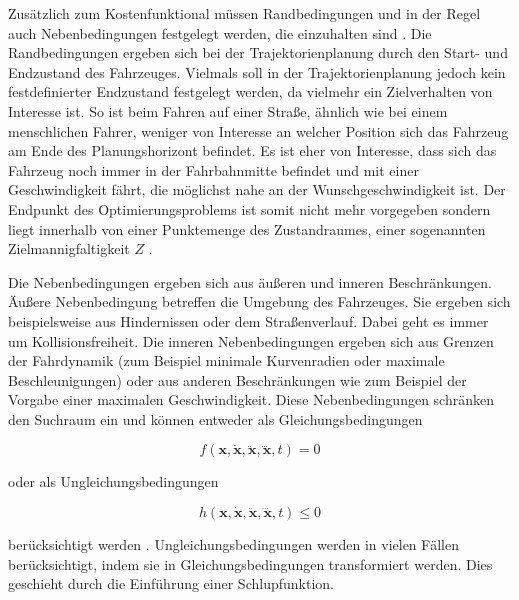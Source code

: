 Zus\"atzlich zum Kostenfunktional m\"ussen Randbedingungen und in der Regel auch Nebenbedingungen festgelegt werden, die einzuhalten sind \cite{Follinger1988}.
Die Randbedingungen ergeben sich bei der Trajektorienplanung durch den Start- und  Endzustand des Fahrzeuges.
Vielmals soll in der Trajektorienplanung jedoch kein festdefinierter Endzustand festgelegt werden, da vielmehr ein Zielverhalten von Interesse ist. 
So ist beim Fahren auf einer Stra{\ss}e, \"ahnlich wie bei einem menschlichen Fahrer, weniger von Interesse an welcher Position sich das Fahrzeug am Ende des Planungshorizont befindet. 
Es ist eher von Interesse, dass sich das Fahrzeug noch immer in der Fahrbahnmitte befindet und mit einer Geschwindigkeit  f\"ahrt, die m\"oglichst nahe an der Wunschgeschwindigkeit ist.
Der Endpunkt des Optimierungsproblems ist somit nicht mehr vorgegeben sondern liegt innerhalb von einer Punktemenge des Zustandraumes, einer sogenannten Zielmannigfaltigkeit \(Z\) \cite{Follinger1988}. 

Die Nebenbedingungen ergeben sich aus \"au{\ss}eren und inneren Beschr\"ankungen. 
\"Au{\ss}ere Nebenbedingung betreffen die Umgebung des Fahrzeuges. 
Sie ergeben sich beispielsweise aus Hindernissen oder dem Stra{\ss}enverlauf. 
Dabei geht es immer um Kollisionsfreiheit. 
Die inneren Nebenbedingungen ergeben sich aus Grenzen der Fahrdynamik (zum Beispiel minimale Kurvenradien oder maximale Beschleunigungen) oder aus anderen Beschr\"ankungen wie zum Beispiel der Vorgabe einer maximalen Geschwindigkeit. \cite{Ziegler2017}
Diese Nebenbedingungen schr\"anken den Suchraum ein und k\"onnen entweder als Gleichungsbedingungen

\begin{equation} 
  f( \pmb{x}, \pmb{\dot{x}}, \pmb{\ddot{x}}, \pmb{\dddot{x}}, t) = 0
  \label{eq:Kostenfunktional}
\end{equation} 

oder als Ungleichungsbedingungen

\begin{equation} 
  h( \pmb{x}, \pmb{\dot{x}}, \pmb{\ddot{x}}, \pmb{\dddot{x}}, t) \leq 0
  \label{eq:Kostenfunktional}
\end{equation} 

ber\"ucksichtigt werden \cite{Papageorgiou1991}.
Ungleichungsbedingungen werden in vielen F\"allen ber\"ucksichtigt, indem sie in Gleichungsbedingungen transformiert werden.
Dies geschieht durch die Einf\"uhrung einer Schlupfunktion. \cite{Papageorgiou1991}

